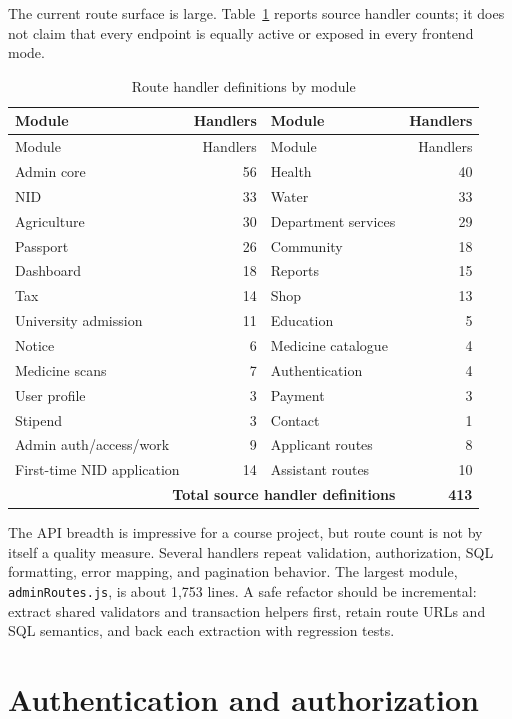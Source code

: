 \documentclass[12pt,a4paper,oneside]{report}
\newcommand{\code}[1]{\texttt{#1}}
\begin{document}
The current route surface is large. Table~\ref{tab:endpoints} reports source handler counts; it
does not claim that every endpoint is equally active or exposed in every frontend mode.

\begin{longtable}{@{}l r l r@{}}
\caption{Route handler definitions by module}\label{tab:endpoints}\\
\toprule
Module & Handlers & Module & Handlers\\
\midrule
\endfirsthead
\toprule
Module & Handlers & Module & Handlers\\
\midrule
\endhead
Admin core & 56 & Health & 40\\
NID & 33 & Water & 33\\
Agriculture & 30 & Department services & 29\\
Passport & 26 & Community & 18\\
Dashboard & 18 & Reports & 15\\
Tax & 14 & Shop & 13\\
University admission & 11 & Education & 5\\
Notice & 6 & Medicine catalogue & 4\\
Medicine scans & 7 & Authentication & 4\\
User profile & 3 & Payment & 3\\
Stipend & 3 & Contact & 1\\
Admin auth/access/work & 9 & Applicant routes & 8\\
First-time NID application & 14 & Assistant routes & 10\\
\midrule
\multicolumn{3}{r}{\textbf{Total source handler definitions}} & \textbf{413}\\
\bottomrule
\end{longtable}

The API breadth is impressive for a course project, but route count is not by itself a quality
measure. Several handlers repeat validation, authorization, SQL formatting, error mapping, and
pagination behavior. The largest module, \code{adminRoutes.js}, is about 1,753 lines. A safe
refactor should be incremental: extract shared validators and transaction helpers first, retain
route URLs and SQL semantics, and back each extraction with regression tests.

\section{Authentication and authorization}
\end{document}
